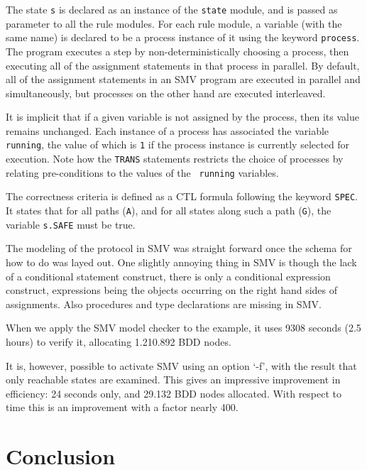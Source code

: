 The  state {\tt s}   is declared as  an instance   of the  {\tt state}
module, and is passed as parameter to all  the rule modules.  For each
rule  module,  a variable  (with the  same name) is   declared to be a
process instance of it  using the keyword  {\tt process}. The  program
executes  a  step by  non-deterministically  choosing a  process, then
executing   all  of  the assignment   statements   in that  process in
parallel. By  default, all  of   the assignment statements  in  an SMV
program are executed in  parallel and simultaneously, but processes on
the other hand are executed interleaved.

It is implicit  that if a given variable  is not assigned by
the process,  then its value  remains  unchanged.  Each instance  of a
process has associated the variable {\tt  running}, the value of which
is   {\tt  1} if  the   process  instance  is   currently selected for
execution. Note how the {\tt TRANS} statements restricts the choice of
processes by relating   pre-conditions to   the values of    the {\tt
running} variables. 

The correctness criteria is  defined as  a  CTL formula  following the
keyword {\tt SPEC}. It states that for all paths ({\tt A}), and for all
states along such a path ({\tt G}), the variable {\tt s.SAFE} must be
true.

The  modeling of the  protocol  in SMV was   straight forward once the
schema for how to do was layed out. One slightly annoying thing in SMV
is though the lack of a conditional statement construct, there is only
a conditional  expression   construct, expressions  being   the objects
occurring on the right hand sides of  assignments. Also procedures and
type declarations are missing in SMV.

When we apply the  SMV model checker to  the  example, it uses  9308
seconds (2.5 hours) to verify it, allocating 1.210.892 BDD nodes. 

It  is, however, possible to activate  SMV using an  option `-f', with
the  result that only reachable   states are examined.  This gives  an
impressive improvement in efficiency: 24  seconds only, and 29.132 BDD
nodes allocated.  With respect to time  this is an  improvement with a
factor nearly 400.  


\section{Conclusion}

